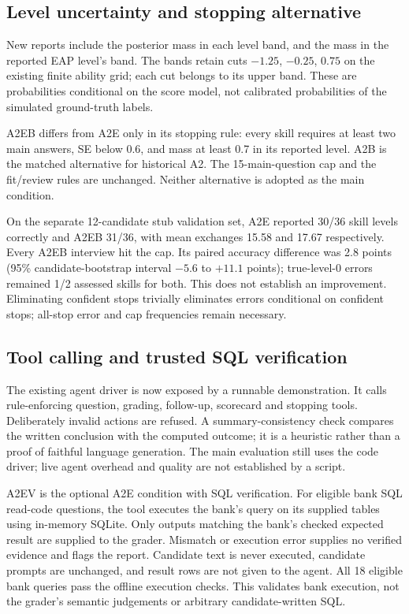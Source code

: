 \subsection{Level uncertainty and stopping alternative}
New reports include the posterior mass in each level band, and the mass in the reported
EAP level's band. The bands retain cuts $-1.25$, $-0.25$, $0.75$ on the existing finite
ability grid; each cut belongs to its upper band. These are probabilities conditional on the
score model, not calibrated probabilities of the simulated ground-truth labels.

A2EB differs from A2E only in its stopping rule: every skill requires at least two main
answers, SE below 0.6, and mass at least 0.7 in its reported level. A2B is the matched
alternative for historical A2. The 15-main-question cap and the fit/review rules are unchanged.
Neither alternative is adopted as the main condition.

On the separate 12-candidate stub validation set, A2E reported 30/36 skill levels correctly
and A2EB 31/36, with mean exchanges 15.58 and 17.67 respectively. Every A2EB interview hit
the cap. Its paired accuracy difference was 2.8 points (95\% candidate-bootstrap interval
$-5.6$ to $+11.1$ points); true-level-0 errors remained 1/2 assessed skills for both.
This does not establish an improvement. Eliminating confident stops trivially eliminates
errors conditional on confident stops; all-stop error and cap frequencies remain necessary.

\subsection{Tool calling and trusted SQL verification}
The existing agent driver is now exposed by a runnable demonstration. It calls rule-enforcing
question, grading, follow-up, scorecard and stopping tools. Deliberately invalid actions are
refused. A summary-consistency check compares the written conclusion with the computed outcome;
it is a heuristic rather than a proof of faithful language generation. The main evaluation
still uses the code driver; live agent overhead and quality are not established by a script.

A2EV is the optional A2E condition with SQL verification. For eligible bank SQL read-code
questions, the tool executes the bank's query on its supplied tables using in-memory SQLite.
Only outputs matching the bank's checked expected result are supplied to the grader.
Mismatch or execution error supplies no verified evidence and flags the report. Candidate
text is never executed, candidate prompts are unchanged, and result rows are not given to the
agent. All 18 eligible bank queries pass the offline execution checks. This validates bank
execution, not the grader's semantic judgements or arbitrary candidate-written SQL.

